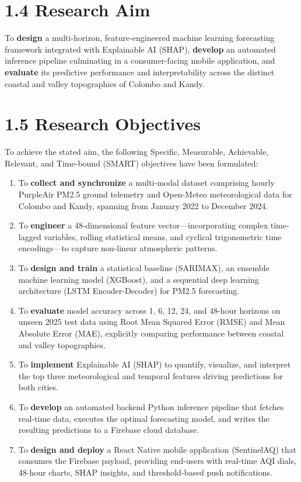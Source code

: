 \section{1.4 Research Aim}\label{research-aim}

To \textbf{design} a multi-horizon, feature-engineered machine learning
forecasting framework integrated with Explainable AI (SHAP),
\textbf{develop} an automated inference pipeline culminating in a
consumer-facing mobile application, and \textbf{evaluate} its predictive
performance and interpretability across the distinct coastal and valley
topographies of Colombo and Kandy.

\section{1.5 Research Objectives}\label{research-objectives}

To achieve the stated aim, the following Specific, Measurable,
Achievable, Relevant, and Time-bound (SMART) objectives have been
formulated:

\begin{enumerate}
\def\labelenumi{\arabic{enumi}.}
\tightlist
\item
  To \textbf{collect and synchronize} a multi-modal dataset comprising
  hourly PurpleAir PM2.5 ground telemetry and Open-Meteo meteorological
  data for Colombo and Kandy, spanning from January 2022 to December
  2024.
\item
  To \textbf{engineer} a 48-dimensional feature vector---incorporating
  complex time-lagged variables, rolling statistical means, and cyclical
  trigonometric time encodings---to capture non-linear atmospheric
  patterns.
\item
  To \textbf{design and train} a statistical baseline (SARIMAX), an
  ensemble machine learning model (XGBoost), and a sequential deep
  learning architecture (LSTM Encoder-Decoder) for PM2.5 forecasting.
\item
  To \textbf{evaluate} model accuracy across 1, 6, 12, 24, and 48-hour
  horizons on unseen 2025 test data using Root Mean Squared Error (RMSE)
  and Mean Absolute Error (MAE), explicitly comparing performance
  between coastal and valley topographies.
\item
  To \textbf{implement} Explainable AI (SHAP) to quantify, visualize,
  and interpret the top three meteorological and temporal features
  driving predictions for both cities.
\item
  To \textbf{develop} an automated backend Python inference pipeline
  that fetches real-time data, executes the optimal forecasting model,
  and writes the resulting predictions to a Firebase cloud database.
\item
  To \textbf{design and deploy} a React Native mobile application
  (SentinelAQ) that consumes the Firebase payload, providing end-users
  with real-time AQI dials, 48-hour charts, SHAP insights, and
  threshold-based push notifications.
\end{enumerate}

